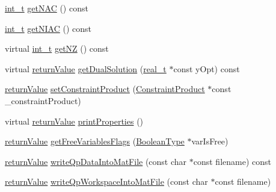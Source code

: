 \begin{DoxyCompactItemize}
\item 
\hyperlink{_types_8hpp_ab6fd6105e64ed14a0c9281326f05e623}{int\+\_\+t} \hyperlink{class_q_problem_a0c7a881779dd2b8fa645b184f1993209}{get\+N\+AC} () const
\item 
\hyperlink{_types_8hpp_ab6fd6105e64ed14a0c9281326f05e623}{int\+\_\+t} \hyperlink{class_q_problem_ac53a0fa59013e0b598eb1a14e0d4ffd5}{get\+N\+I\+AC} () const
\item 
virtual \hyperlink{_types_8hpp_ab6fd6105e64ed14a0c9281326f05e623}{int\+\_\+t} \hyperlink{class_q_problem_abc038fbdddcb04db736cdd3fab4d9a1a}{get\+NZ} () const
\item 
virtual \hyperlink{_message_handling_8hpp_a81d556f613bfbabd0b1f9488c0fa865e}{return\+Value} \hyperlink{class_q_problem_ae58420046e14b4b252c6833e2bd09b09}{get\+Dual\+Solution} (\hyperlink{qp_o_a_s_e_s__wrapper_8h_a0d00e2b3dfadee81331bbb39068570c4}{real\+\_\+t} $\ast$const y\+Opt) const
\item 
\hyperlink{_message_handling_8hpp_a81d556f613bfbabd0b1f9488c0fa865e}{return\+Value} \hyperlink{class_q_problem_a7405bfa255fa9d05172b2929a3d74825}{set\+Constraint\+Product} (\hyperlink{class_constraint_product}{Constraint\+Product} $\ast$const \+\_\+constraint\+Product)
\item 
virtual \hyperlink{_message_handling_8hpp_a81d556f613bfbabd0b1f9488c0fa865e}{return\+Value} \hyperlink{class_q_problem_a589e2b01326f871820f24d47fa4372e8}{print\+Properties} ()
\item 
\hyperlink{_message_handling_8hpp_a81d556f613bfbabd0b1f9488c0fa865e}{return\+Value} \hyperlink{class_q_problem_a08dc923d7c2b0bffd33fbab63688d3a7}{get\+Free\+Variables\+Flags} (\hyperlink{_types_8hpp_a20f82124c82b6f5686a7fce454ef9089}{Boolean\+Type} $\ast$var\+Is\+Free)
\item 
\hyperlink{_message_handling_8hpp_a81d556f613bfbabd0b1f9488c0fa865e}{return\+Value} \hyperlink{class_q_problem_ae95efbe76bfb4d411e671a2a066d8178}{write\+Qp\+Data\+Into\+Mat\+File} (const char $\ast$const filename) const
\item 
\hyperlink{_message_handling_8hpp_a81d556f613bfbabd0b1f9488c0fa865e}{return\+Value} \hyperlink{class_q_problem_a56ac3a8ac5d5bf76574305ca55cb5750}{write\+Qp\+Workspace\+Into\+Mat\+File} (const char $\ast$const filename)
\end{DoxyCompactItemize}

